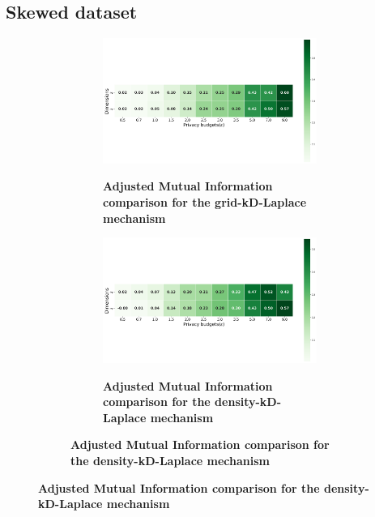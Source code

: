 \subsection{Skewed dataset} \label{appendix:results-mechanism-utility-skewed-dataset}

\begin{figure}[H]
    \centering
    \begin{subfigure}[b]{0.90\textwidth}
        \begin{subfigure}[c]{1\textwidth}
            \caption{\textbf{Adjusted Mutual Information comparison for the grid-kD-Laplace mechanism}}
            \includegraphics[width=1\textwidth]{Results/kd-laplace/grid-kd-Laplace/skewed-dataset/ami.png}
            \label{fig:ami_skewed-dataset_comparison_grid-kd_2d}
        \end{subfigure}
        \vfill %
        \begin{subfigure}[c]{1\textwidth}
            \caption{\textbf{Adjusted Mutual Information comparison for the density-kD-Laplace mechanism}}
            \includegraphics[width=1\textwidth]{Results/kd-laplace/density-kd-Laplace/skewed-dataset/ami.png}
            \label{fig:ami_skewed-dataset_comparison_density-kd_2d}
        \end{subfigure}
    \end{subfigure}
\end{figure}
\newpage
